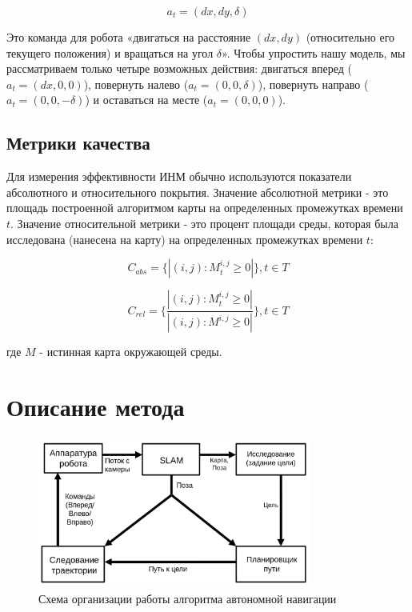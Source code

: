 \documentclass{mipt-thesis-ms}
\begin{document}
	$$ a_t = (dx, dy, \delta) $$
	
	Это команда для робота «двигаться на расстояние $ (dx, dy) $ (относительно его текущего положения) и вращаться на угол $ \delta $». Чтобы упростить нашу модель, мы рассматриваем только четыре возможных действия: двигаться вперед ($ a_t = (dx, 0, 0) $), повернуть налево ($ a_t = (0, 0, \delta) $), повернуть направо ($ a_t = (0, 0, - \delta) $) и оставаться на месте ($ a_t = (0, 0, 0) $).
	
	\subsection{Метрики качества}
	
	Для измерения эффективности ИНМ обычно используются показатели абсолютного и относительного покрытия. Значение абсолютной метрики - это площадь построенной алгоритмом карты на определенных промежутках времени $ t $. Значение относительной метрики - это процент площади среды, которая была исследована (нанесена на карту) на определенных промежутках времени $ t $:
	
	\begin{equation}
	C_{abs} = \{|(i,j): M_t^{i,j} \geq 0|\}, t \in T
	\label{eq_cov_abs}
	\end{equation}
	
	\begin{equation}
	C_{rel} = \lbrace \frac{|(i,j): M_t^{i,j} \geq 0|}{|(i,j): M^{i,j} \geq 0|} \rbrace, t \in T
	\label{eq_cov_rel}
	\end{equation}
	
	где $M$ - истинная карта окружающей среды.
	
	\section{Описание метода}
	
	\begin{figure}
		\centering
		\includegraphics[width=0.8\textwidth]{img/pipeline_scheme_rus.png}
		\caption{Схема организации работы алгоритма автономной навигации}
		\label{figure_pipeline}
	\end{figure}
	
\end{document}
